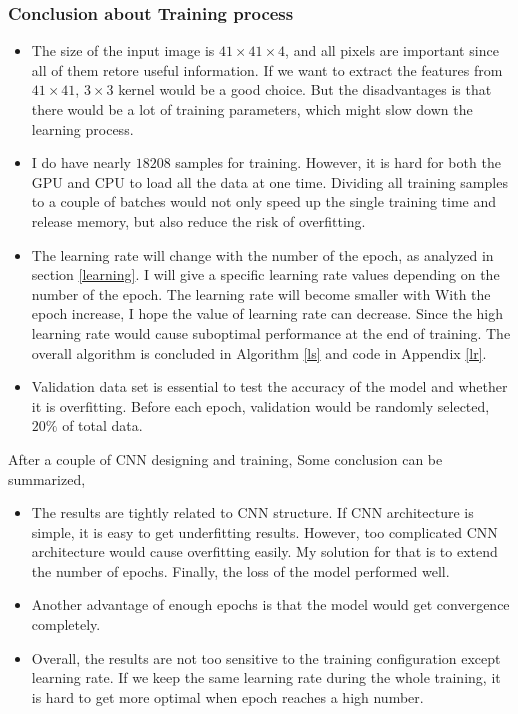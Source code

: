     \subsubsection{Conclusion about Training process}
    \begin{itemize}
        \item The size of the input image is $41\times41\times4$, and all pixels are important since all of them retore useful information. If we want to extract the features from $41\times 41$, $3\times 3$ kernel would be a good choice. But the disadvantages is that there would be a lot of training parameters, which might slow down the learning process.
        \item I do have nearly $18208$ samples for training. However, it is hard for both the GPU and CPU to load all the data at one time. Dividing all training samples to a couple of batches would not only speed up the single training time and release memory, but also reduce the risk of overfitting.
        \item The learning rate will change with the number of the epoch, as analyzed in section \ref{learning}. I will give a specific learning rate values depending on the number of the epoch. The learning rate will become smaller with With the epoch increase, I hope the value of learning rate can decrease. Since the high learning rate would cause suboptimal performance at the end of training. The overall algorithm is concluded in Algorithm \ref{ls} and code in Appendix \ref{lr}.
        \item Validation data set is essential to test the accuracy of the model and whether it is overfitting. Before each epoch, validation would be randomly selected, $20\%$ of total data.
    \end{itemize}

    After a couple of CNN designing and training, Some conclusion can be summarized,
    \begin{itemize}
        \item The results are tightly related to CNN structure. If CNN architecture is simple, it is easy to get underfitting results. However, too complicated CNN architecture would cause overfitting easily. My solution for that is to extend the number of epochs. Finally, the loss of the model performed well.
        \item Another advantage of enough epochs is that the model would get convergence completely.
        \item Overall, the results are not too sensitive to the training configuration except learning rate. If we keep the same learning rate during the whole training, it is hard to get more optimal when epoch reaches a high number.
    \end{itemize}


